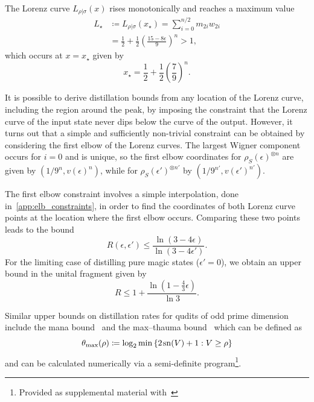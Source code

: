 \documentclass[pra,
aps,
twocolumn,
superscriptaddress,
groupedaddress,
nofootinbib,
reprint
]{revtex4-1}
\begin{document}
The Lorenz curve $L_{\rho|\sigma}(x)$ rises monotonically and reaches a maximum value
\begin{align}\label{eq:lcsu_max}
	L_\star &\coloneqq L_{\rho |\sigma} (x_\star) = \sum_{i = 0}^{n/2} m_{2i} w_{2i} \nonumber\\
	&= \frac{1}{2} + \frac{1}{2}\left(\frac{15 - 8\epsilon}{9}\right)^n > 1,
\end{align}
which occurs at $x=x_\star$ given by
\begin{equation}
	x_\star = \frac{1}{2} + \frac{1}{2}\left(\frac{7}{9}\right)^n.
\end{equation}

It is possible to derive distillation bounds from any location of the Lorenz curve, including the region around the peak, by imposing the constraint that the Lorenz curve of the input state never dips below the curve of the output.
However, it turns out that a simple and sufficiently non-trivial constraint can be obtained by considering the first elbow of the Lorenz curves. 
The largest Wigner component occurs for $i=0$ and is unique, so the first elbow coordinates for $\rho_S(\epsilon)^{\otimes n}$ are given by $(1/9^n, v(\epsilon)^n)$, while for $\rho_S(\epsilon')^{\otimes n'}$ by $(1/9^{n'}, v(\epsilon')^{n'})$.

The first elbow constraint involves a simple interpolation, done in~\cref{app:elb_constraints}, in order to find the coordinates of both Lorenz curve points at the location where the first elbow occurs. 
Comparing these two points leads to the bound
\begin{equation}
	R(\epsilon, \epsilon') \leq \frac{\ln{(3-4\epsilon)}}{\ln{(3-4\epsilon')}}.
\end{equation}
For the limiting case of distilling pure magic states ($\epsilon'=0$), we obtain an upper bound in the unital fragment given by
\begin{equation}
	R \leq 1 + \frac{\ln (1 - \frac{4}{3} \epsilon)}{\ln 3}.
\end{equation}

Similar upper bounds on distillation rates for qudits of odd prime dimension include the mana bound~\cite{cit:veitch} and the max--thauma bound~\cite{Wang_2020} which can be defined as
\begin{equation}
	\theta_{\rm{max}}(\rho) \coloneqq \log_2{\min{\{2\hspace{1pt} {{\rm{sn}}(V)} +1 : V \geq \rho\}}}
\end{equation}
and can be calculated numerically via a semi-definite program\footnote{Provided as supplemental material with~\cite{Wang_2020}}.
\end{document}
